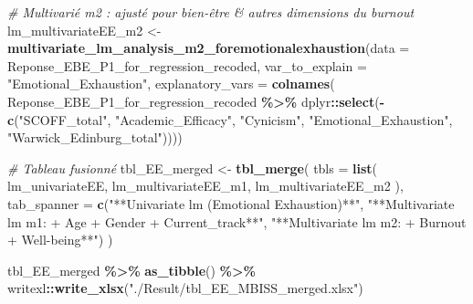 \documentclass[
]{article}
\newenvironment{Shaded}{\begin{snugshade}}{\end{snugshade}}
\newcommand{\AttributeTok}[1]{\textcolor[rgb]{0.13,0.29,0.53}{#1}}
\newcommand{\CommentTok}[1]{\textcolor[rgb]{0.56,0.35,0.01}{\textit{#1}}}
\newcommand{\FunctionTok}[1]{\textcolor[rgb]{0.13,0.29,0.53}{\textbf{#1}}}
\newcommand{\NormalTok}[1]{#1}
\newcommand{\OtherTok}[1]{\textcolor[rgb]{0.56,0.35,0.01}{#1}}
\newcommand{\SpecialCharTok}[1]{\textcolor[rgb]{0.81,0.36,0.00}{\textbf{#1}}}
\newcommand{\StringTok}[1]{\textcolor[rgb]{0.31,0.60,0.02}{#1}}
\begin{document}
\begin{Shaded}
\begin{Highlighting}[]
\CommentTok{\# Multivarié m2 : ajusté pour bien{-}être \& autres dimensions du burnout}
\NormalTok{lm\_multivariateEE\_m2 }\OtherTok{\textless{}{-}}
  \FunctionTok{multivariate\_lm\_analysis\_m2\_foremotionalexhaustion}\NormalTok{(}\AttributeTok{data =}\NormalTok{ Reponse\_EBE\_P1\_for\_regression\_recoded, }
                                                        \AttributeTok{var\_to\_explain =} \StringTok{"Emotional\_Exhaustion"}\NormalTok{, }
                                                        \AttributeTok{explanatory\_vars =}
                                                          \FunctionTok{colnames}\NormalTok{(}
\NormalTok{                                                            Reponse\_EBE\_P1\_for\_regression\_recoded }\SpecialCharTok{\%\textgreater{}\%}
\NormalTok{                                                              dplyr}\SpecialCharTok{::}\FunctionTok{select}\NormalTok{(}\SpecialCharTok{{-}}\FunctionTok{c}\NormalTok{(}\StringTok{"SCOFF\_total"}\NormalTok{, }\StringTok{"Academic\_Efficacy"}\NormalTok{, }
                                                                               \StringTok{"Cynicism"}\NormalTok{,}
                                                                               \StringTok{"Emotional\_Exhaustion"}\NormalTok{, }\StringTok{"Warwick\_Edinburg\_total"}\NormalTok{))))}

\CommentTok{\# Tableau fusionné}
\NormalTok{tbl\_EE\_merged }\OtherTok{\textless{}{-}}
  \FunctionTok{tbl\_merge}\NormalTok{(}
    \AttributeTok{tbls =} \FunctionTok{list}\NormalTok{(}
\NormalTok{      lm\_univariateEE,}
\NormalTok{      lm\_multivariateEE\_m1,}
\NormalTok{      lm\_multivariateEE\_m2}
\NormalTok{    ),}
    \AttributeTok{tab\_spanner =} \FunctionTok{c}\NormalTok{(}\StringTok{"**Univariate lm (Emotional Exhaustion)**"}\NormalTok{,}
                    \StringTok{"**Multivariate lm m1: + Age + Gender + Current\_track**"}\NormalTok{,}
                    \StringTok{"**Multivariate lm m2: + Burnout + Well{-}being**"}\NormalTok{)}
\NormalTok{  )}

\NormalTok{tbl\_EE\_merged }\SpecialCharTok{\%\textgreater{}\%}
  \FunctionTok{as\_tibble}\NormalTok{() }\SpecialCharTok{\%\textgreater{}\%}
\NormalTok{  writexl}\SpecialCharTok{::}\FunctionTok{write\_xlsx}\NormalTok{(}\StringTok{"./Result/tbl\_EE\_MBISS\_merged.xlsx"}\NormalTok{)}
\end{Highlighting}
\end{Shaded}
\end{document}
